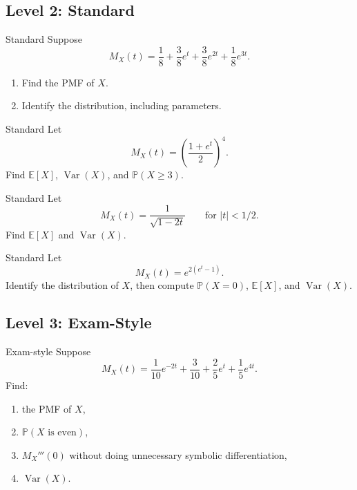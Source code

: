 \documentclass[12pt]{article}
\newcommand{\EE}{\mathbb{E}}
\newcommand{\PP}{\mathbb{P}}
\newcommand{\Var}{\operatorname{Var}}
\newcommand{\writespace}[1]{\vspace*{#1}}
\newcommand{\medws}{\writespace{1.8cm}}
\newcommand{\longws}{\writespace{2.8cm}}
\newcommand{\xlongws}{\writespace{4.1cm}}
\newcounter{problem}[section]
\begin{document}
\subsection*{Level 2: Standard}

\begin{practiceproblem}{Standard}
Suppose
\[
  M_X(t)=\frac18+\frac38 e^t+\frac38 e^{2t}+\frac18 e^{3t}.
\]
\begin{enumerate}
  \item Find the PMF of $X$.
  \item Identify the distribution, including parameters.
\end{enumerate}
\end{practiceproblem}
\medws

\begin{practiceproblem}{Standard}
Let
\[
  M_X(t)=\left(\frac{1+e^t}{2}\right)^4.
\]
Find $\EE[X]$, $\Var(X)$, and $\PP(X\ge 3)$.
\end{practiceproblem}
\longws

\begin{practiceproblem}{Standard}
Let
\[
  M_X(t)=\frac{1}{\sqrt{1-2t}}
  \qquad\text{for } |t|<1/2.
\]
Find $\EE[X]$ and $\Var(X)$.
\end{practiceproblem}
\medws

\begin{practiceproblem}{Standard}
Let
\[
  M_X(t)=e^{2(e^t-1)}.
\]
Identify the distribution of $X$, then compute $\PP(X=0)$, $\EE[X]$, and $\Var(X)$.
\end{practiceproblem}
\medws

\subsection*{Level 3: Exam-Style}

\begin{practiceproblem}{Exam-style}
Suppose
\[
  M_X(t)=\frac{1}{10}e^{-2t}+\frac{3}{10}+\frac{2}{5}e^t+\frac{1}{5}e^{4t}.
\]
Find:
\begin{enumerate}
  \item the PMF of $X$,
  \item $\PP(X\text{ is even})$,
  \item $M_X'''(0)$ without doing unnecessary symbolic differentiation,
  \item $\Var(X)$.
\end{enumerate}
\end{practiceproblem}
\xlongws

\clearpage
\end{document}

